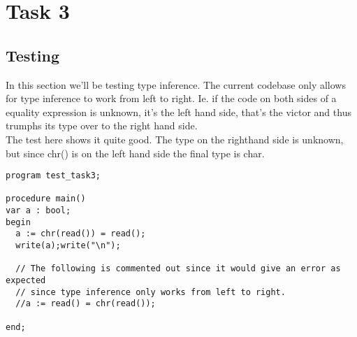 \section{Task 3}

\subsection{Testing}
In this section we'll be testing type inference. The current codebase only
allows for type inference to work from left to right. Ie. if the code on both
sides of a equality expression is unknown, it's the left hand side, that's the
victor and thus trumphs its type over to the right hand side.\\
The test here shows it quite good. The type on the righthand side is unknown,
but since chr() is on the left hand side the final type is char.


\begin{lstlisting}[style=MLStyle]
program test_task3;

procedure main()
var a : bool;
begin
  a := chr(read()) = read();
  write(a);write("\n");

  // The following is commented out since it would give an error as expected
  // since type inference only works from left to right.
  //a := read() = chr(read());

end;
\end{lstlisting}
